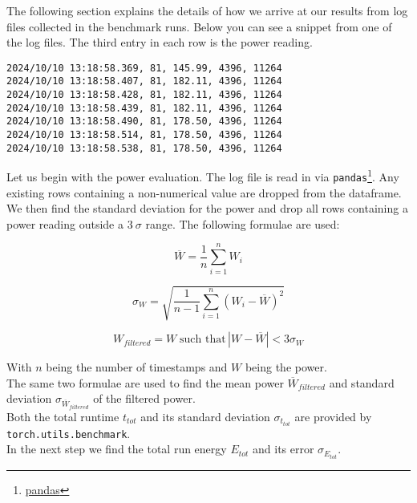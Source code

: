 The following section explains the details of how we arrive at our results from log files collected in the benchmark runs. Below you can see a snippet from one of the log files. The third entry in each row is the power reading.

\begin{verbatim}
2024/10/10 13:18:58.369, 81, 145.99, 4396, 11264
2024/10/10 13:18:58.407, 81, 182.11, 4396, 11264
2024/10/10 13:18:58.428, 81, 182.11, 4396, 11264
2024/10/10 13:18:58.439, 81, 182.11, 4396, 11264
2024/10/10 13:18:58.490, 81, 178.50, 4396, 11264
2024/10/10 13:18:58.514, 81, 178.50, 4396, 11264
2024/10/10 13:18:58.538, 81, 178.50, 4396, 11264
\end{verbatim}

Let us begin with the power evaluation. The log file is read in via \texttt{pandas}\footnote{\href{https://pandas.pydata.org/}{pandas}}. Any existing rows containing a non-numerical value are dropped from the dataframe. We then find the standard deviation for the power and drop all rows containing a power reading outside a $3 \: \sigma $ range. The following formulae are used:

\begin{equation}
\overline{W} = \frac{1}{n} \sum_{i=1}^{n} W_i
\end{equation}

\begin{equation}
\sigma_W = \sqrt{\frac{1}{n - 1} \sum_{i=1}^{n} (W_i - \overline{W})^2}
\end{equation}

\begin{equation}
W_{filtered} = W \; \text{such that} \, |W - \overline{W}| < 3 \sigma_W
\end{equation}
    
With \( n \) being the number of timestamps and \( W \) being the power. \\
The same two formulae are used to find the mean power \( \overline{W}_{filtered} \) and standard deviation \( \sigma_{\overline{W}_{filtered}} \) of the filtered power. \\
Both the total runtime \(t_{tot}\) and its standard deviation \(\sigma_{t_{tot}} \) are provided by \texttt{torch.utils.benchmark}.\\
In the next step we find the total run energy \( E_{tot} \) and its error \( \sigma_{E_{tot}} \).

